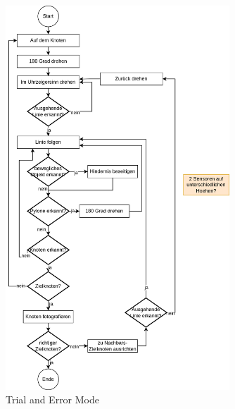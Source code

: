 \begin{figure}[H]
\centering
\includegraphics[width=0.75\textwidth]{assets/informatik-prototyp/simulator/simulator-trial-and-error-mode.png}
\caption{Trial and Error Mode}
\label{fig:sim-gui}
\end{figure}